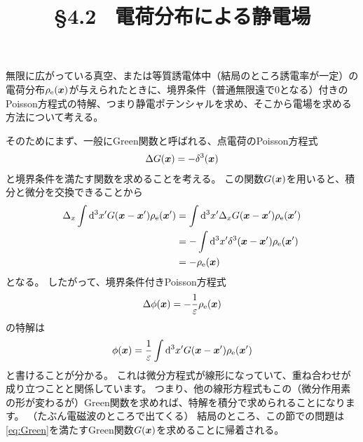 \documentclass[a4paper]{jsarticle}
\title{\S 4.2 \ 電荷分布による静電場}
\def\vec#1{\mbox{\boldmath $#1$}}
\newcommand{\ddif}{{\rm d}}
\begin{document}
\maketitle

無限に広がっている真空、または等質誘電体中（結局のところ誘電率が一定）の電荷分布$\rho_{\rm e}(\vec{x})$が与えられたときに、境界条件（普通無限遠で0となる）付きのPoisson方程式の特解、つまり静電ポテンシャルを求め、そこから電場を求める方法について考える。

そのためにまず、一般にGreen関数と呼ばれる、点電荷のPoisson方程式
\begin{align}
	\Delta G(\vec{x}) = -\delta^3(\vec{x}) \label{eq:Green}
\end{align}
と境界条件を満たす関数を求めることを考える。
この関数$G(\vec{x})$を用いると、積分と微分を交換できることから
\begin{align}
	\Delta_x \int \ddif^3 x^{\prime} G(\vec{x} - \vec{x}^{\prime}) \rho_{\rm e} (\vec{x}^{\prime})
	&= \int \ddif^3 x^{\prime} \Delta_x G(\vec{x} - \vec{x}^{\prime}) \rho_{\rm e} (\vec{x}^{\prime}) \\
	&= -\int \ddif^3 x^{\prime} \delta^3(\vec{x} - \vec{x}^{\prime}) \rho_{\rm e}(\vec{x}^{\prime}) \\
	&= -\rho_{\rm e}(\vec{x})
\end{align}
となる。
したがって、境界条件付きPoisson方程式
\begin{align}
	\Delta \phi(\vec{x}) = -\frac{1}{\varepsilon} \rho_{\rm e}(\vec{x}) \label{eq:Poisson}
\end{align}
の特解は
\begin{align}
	\phi(\vec{x}) = \frac{1}{\varepsilon} \int \ddif^3 x^{\prime} G(\vec{x} - \vec{x}^{\prime}) \rho_{\rm e} (\vec{x}^{\prime})
\end{align}
と書けることが分かる。
これは微分方程式が線形になっていて、重ね合わせが成り立つことと関係しています。
つまり、他の線形方程式もこの（微分作用素の形が変わるが）Green関数を求めれば、特解を積分で求められることになります。
（たぶん電磁波のところで出てくる）
結局のところ、この節での問題は\eqref{eq:Green}を満たすGreen関数$G(\vec{x})$を求めることに帰着される。
\end{document}
